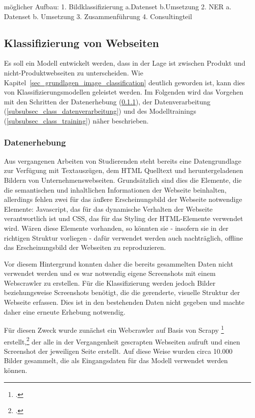 möglicher Aufbau:
1.	Bildklassifizierung
	a.Datenset
	b.Umsetzung
2.	NER
	a.	Datenset
	b.	Umsetzung
3.	Zusammenführung
4.	Consultingteil

\subsection{Klassifizierung von Webseiten}\label{subsec_klassifierung_websites}
Es soll ein Modell entwickelt werden, dass in der Lage ist zwischen Produkt und nicht-Produktwebseiten zu unterscheiden.
Wie Kapitel~\ref{sec_grundlagen_image_classification} deutlich geworden ist, kann dies von Klassifizierungsmodellen geleistet werden.
Im Folgenden wird das Vorgehen mit den Schritten der Datenerhebung (\ref{subsubsec_class_datenerhebung}), der Datenverarbeitung (\ref{subsubsec_class_datenverarbeitung}) und des Modelltrainings (\ref{subsubsec_class_training}) näher beschrieben.

\subsubsection{Datenerhebung}\label{subsubsec_class_datenerhebung}
Aus vergangenen Arbeiten von Studierenden steht bereits eine Datengrundlage zur Verfügung mit Textauszügen, dem HTML Quelltext und heruntergeladenen Bildern von Unternehmenswebseiten.
Grundsätzlich sind dies die Elemente, die die semantischen und inhaltlichen Informationen der Webseite beinhalten, allerdings fehlen zwei für das äußere Erscheinungsbild der Webseite notwendige Elemente:
Javascript, das für das dynamische Verhalten der Webseite verantwortlich ist und CSS, das für das Styling der HTML-Elemente verwendet wird.
Wären diese Elemente vorhanden, so könnten sie - insofern sie in der richtigen Struktur vorliegen - dafür verwendet werden auch nachträglich, offline das Erscheinungsbild der Webseiten zu reproduzieren.

Vor diesem Hintergrund konnten daher die bereits gesammelten Daten nicht verwendet werden und es war notwendig eigene Screenshots mit einem Webscrawler zu erstellen.
Für die Klassifizierung werden jedoch Bilder beziehungsweise Screenshots benötigt, die die gerenderte, visuelle Struktur der Webseite erfassen.
Dies ist in den bestehenden Daten nicht gegeben und machte daher eine erneute Erhebung notwendig.

Für diesen Zweck wurde zunächst ein Webcrawler auf Basis von Scrapy \footcite[\vglf][]{zotero-328} erstellt,\footcite[\vglf][]{ostkamp2022} der alle in der Vergangenheit gescrapten Webseiten aufruft und einen Screenshot der jeweiligen Seite erstellt.
Auf diese Weise wurden circa 10.000 Bilder gesammelt, die als Eingangsdaten für das Modell verwendet werden können.

